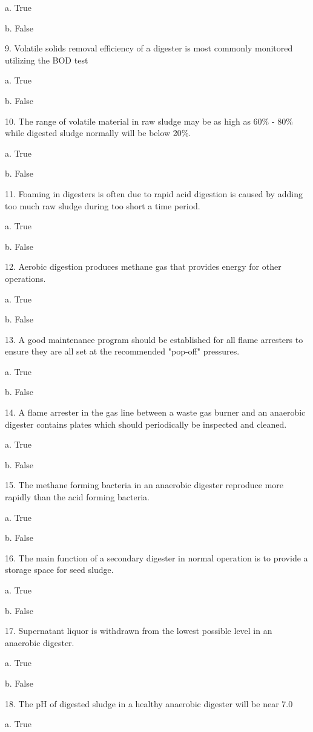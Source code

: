 \documentclass{article}
\begin{document}
a. True 

b. False 


9. Volatile solids removal efficiency of a digester is most commonly monitored utilizing the BOD test

a. True 

b. False 


10. The range of volatile material in raw sludge may be as high as 60\% - 80\% while digested sludge normally will be below 20\%. 

a. True 

b. False 


11. Foaming in digesters is often due to rapid acid digestion is caused by adding too much raw sludge during too short a time period. 

a. True 

b. False 


12. Aerobic digestion produces methane gas that provides energy for other operations. 

a. True 

b. False 


13. A good maintenance program should be established for all flame arresters to ensure they are all set at the recommended "pop-off" pressures. 

a. True 

b. False 


14. A flame arrester in the gas line between a waste gas burner and an anaerobic digester contains plates which should periodically be inspected and cleaned. 

a. True 

b. False 


15. The methane forming bacteria in an anaerobic digester reproduce more rapidly than the acid forming bacteria. 

a. True 

b. False 


16. The main function of a secondary digester in normal operation is to provide a storage space for seed sludge. 

a. True 

b. False 


17. Supernatant liquor is withdrawn from the lowest possible level in an anaerobic digester. 

a. True 

b. False 


18. The pH of digested sludge in a healthy anaerobic digester will be near 7.0 

a. True 
\end{document}
